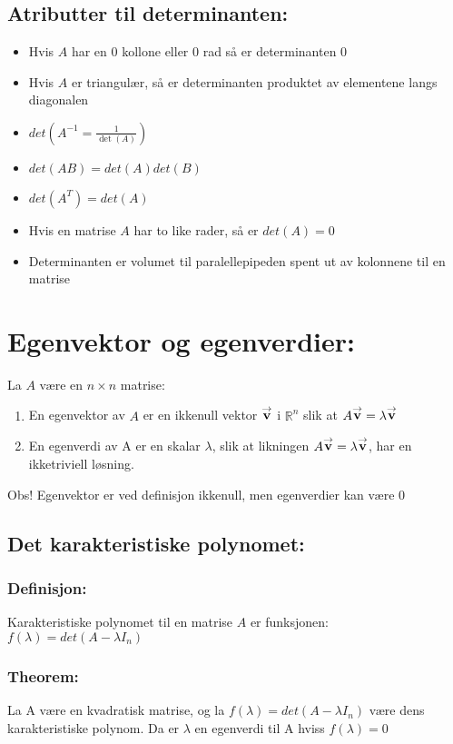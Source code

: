 \documentclass[12pt,a4paper,twocolumn,twoside]{article}
\def\real{\mathbb{R}}
\def\vector#1{\bold{\stackrel{\rightarrow}{#1}}}
\begin{document}
\subsection*{Atributter til determinanten:}
\begin{itemize}[topsep=0pt,itemsep=0pt, partopsep=0pt]
    \item Hvis $A$ har en 0 kollone eller 0 rad så er determinanten 0
    \item Hvis $A$ er triangulær, så er determinanten produktet av elementene langs diagonalen
    \item $det(A^{-1}=\frac{1}{\det(A)})$
    \item $det(AB) = det(A)det(B)$
    \item $det(A^T)=det(A)$
    \item Hvis en matrise $A$ har to like rader, så er $det(A)=0$
    \item Determinanten er volumet til paralellepipeden spent ut av kolonnene til en matrise
\end{itemize}
\section*{Egenvektor og egenverdier:}
La $A$ være en $n\times n$ matrise:
\begin{enumerate}[topsep=0pt,itemsep=0pt, partopsep=0pt]
    \item En egenvektor av $A$ er en ikkenull vektor $\vector{v}$ i $\real^n$
            slik at $A\vector{v}=\lambda \vector{v}$
    \item En egenverdi av A er en skalar $\lambda$, slik at likningen $A\vector{v}=\lambda\vector{v}$, har en ikketriviell løsning.
\end{enumerate}
Obs! Egenvektor er ved definisjon ikkenull, men egenverdier kan være 0
\subsection*{Det karakteristiske polynomet:}
\subsubsection*{Definisjon:}
Karakteristiske polynomet til en matrise $A$ er funksjonen:\\
$f(\lambda)=det(A-\lambda I_n)$
\subsubsection*{Theorem:}
La A være en kvadratisk matrise, og la $f(\lambda)=det(A-\lambda I_n)$ være dens karakteristiske polynom.
Da er $\lambda$ en egenverdi til A hviss $f(\lambda) = 0$
\end{document}
